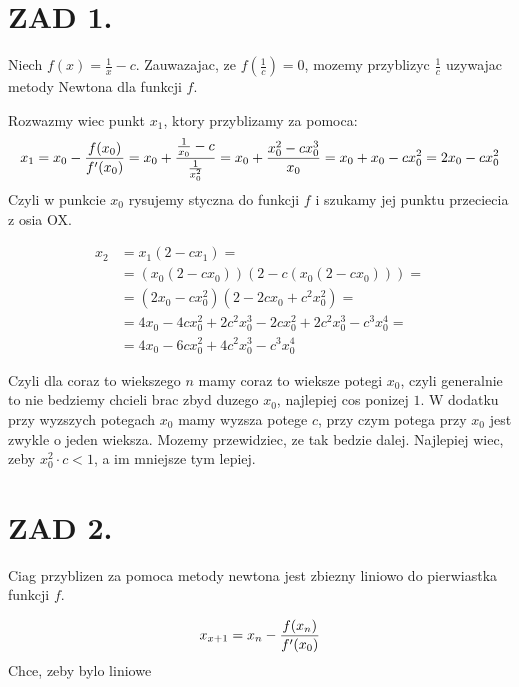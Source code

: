 \documentclass{article}[13pt]
\begin{document}
    \section*{ZAD 1.}
    
    Niech $f(x)=\frac 1x-c$. Zauwazajac, ze $f(\frac1c)=0$, mozemy przyblizyc $\frac1c$ uzywajac metody Newtona dla funkcji $f$.
    \medskip

    Rozwazmy wiec punkt $x_1$, ktory przyblizamy za pomoca:
    $$x_1=x_0-{f(x_0)\over f'(x_0)}=x_0+{\frac1{x_0}-c\over \frac1{x_0^2}}=x_0+{x^2_0-cx_0^3\over x_0}=x_0+x_0-cx_0^2=2x_0-cx_0^2$$
    Czyli w punkcie $x_0$ rysujemy styczna do funkcji $f$ i szukamy jej punktu przeciecia z osia OX.
    \bigskip

    \begin{align*}
        x_2&=x_1(2-cx_1)=\\
        &=(x_0(2-cx_0))(2-c(x_0(2-cx_0)))=\\
        &=(2x_0-cx_0^2)(2-2cx_0+c^2x_0^2)=\\
        &=4x_0-4cx_0^2+2c^2x_0^3-2cx_0^2+2c^2x_0^3-c^3x_0^4=\\
        &=4x_0-6cx_0^2+4c^2x_0^3-c^3x_0^4
    \end{align*}

    Czyli dla coraz to wiekszego $n$ mamy coraz to wieksze potegi $x_0$, czyli generalnie to nie bedziemy chcieli brac zbyd duzego $x_0$, najlepiej cos ponizej $1$. W dodatku przy wyzszych potegach $x_0$ mamy wyzsza potege $c$, przy czym potega przy $x_0$ jest zwykle o jeden wieksza. Mozemy przewidziec, ze tak bedzie dalej. Najlepiej wiec, zeby $x_0^2\cdot c<1$, a im mniejsze tym lepiej.


    \section*{ZAD 2.}

    Ciag przyblizen za pomoca metody newtona jest zbiezny liniowo do pierwiastka funkcji $f$.
    
    $$x_{x+1}=x_n-{f(x_n)\over f'(x_0)}$$
    Chce, zeby bylo liniowe
\end{document}
